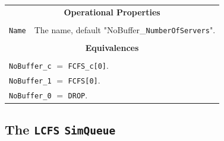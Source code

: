 \documentclass[12pt]{book}
\begin{document}
\begin{tabular}{|l|l|l|l|}
\multicolumn{4}{|c|}{\bf Operational Properties} \\
\multicolumn{4}{|c|}{} \\
\hline
\lstinline|Name| & \multicolumn{3}{|l|}{The name, default "NoBuffer\_\lstinline{NumberOfServers}".} \\
\hline
\multicolumn{4}{|c|}{} \\
\multicolumn{4}{|c|}{\bf Equivalences} \\
\multicolumn{4}{|c|}{} \\
\hline
\multicolumn{4}{|l|}{\lstinline|NoBuffer_c| $=$ \lstinline|FCFS_c[0]|.} \\
\multicolumn{4}{|l|}{\lstinline|NoBuffer_1| $=$ \lstinline|FCFS[0]|.} \\
\multicolumn{4}{|l|}{\lstinline|NoBuffer_0| $=$ \lstinline|DROP|.} \\
\hline
\end{tabular}

\subsection{The \lstinline{LCFS} \lstinline{SimQueue}}
\label{sec:LCFS}
\end{document}
